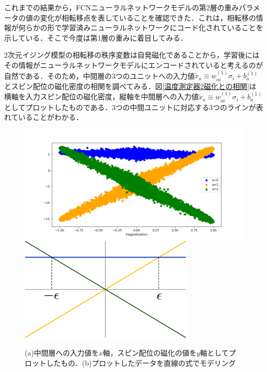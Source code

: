 \documentclass[a4paper,11pt]{jsreport}
\begin{document}
これまでの結果から，FCNニューラルネットワークモデルの第2層の重みパラメータの値の変化が相転移点を表していることを確認できた．これは，相転移の情報が何らかの形で学習済みニューラルネットワークにコード化されていることを示している．そこで今度は第1層の重みに着目してみる．\par
2次元イジング模型の相転移の秩序変数は自発磁化であることから，学習後にはその情報がニューラルネットワークモデルにエンコードされていると考えるのが自然である．そのため，中間層の3つのユニットへの入力値$\tilde{x}_a \equiv w_{ai}^{(1)}\sigma_i + b_a^{(1)}$とスピン配位の磁化密度の相関を調べてみる．図\ref{温度測定器2磁化との相関}は横軸を入力スピン配位の磁化密度，縦軸を中間層への入力値$\tilde{x}_a \equiv w_{ai}^{(1)}\sigma_i + b_a^{(1)}$としてプロットしたものである．3つの中間ユニットに対応する3つのラインが表れていることがわかる．\par

\begin{figure}[H]
  \begin{center}
    \includegraphics[width=\linewidth]{image/温度測定器2_L16_FCN_Nh3_mag.png}
    \subcaption{}
    \label{温度測定器2磁化との相関}
    \includegraphics[height=5cm]{image/温度測定器2_FCN_modeling.png}
    \subcaption{}
    \label{直線の式でモデリング}
  \end{center}
  \caption{(a)中間層への入力値を$x$軸，スピン配位の磁化の値を$y$軸としてプロットしたもの．(b)プロットしたデータを直線の式でモデリング}
\end{figure}
\end{document}
